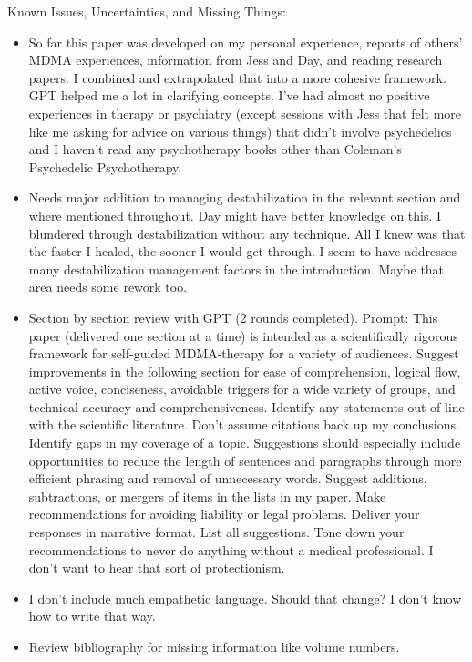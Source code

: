 \documentclass[12pt,letterpaper]{article}
\begin{document}
Known Issues, Uncertainties, and Missing Things:
\begin{itemize}
    \item So far this paper was developed on my personal experience, reports of others' MDMA experiences, information from Jess and Day, and reading research papers. I combined and extrapolated that into a more cohesive framework. GPT helped me a lot in clarifying concepts. I've had almost no positive experiences in therapy or psychiatry (except sessions with Jess that felt more like me asking for advice on various things) that didn't involve psychedelics and I haven't read any psychotherapy books other than Coleman's Psychedelic Psychotherapy.
    \item Needs major addition to managing destabilization in the relevant section and where mentioned throughout. Day might have better knowledge on this. I blundered through destabilization without any technique. All I knew was that the faster I healed, the sooner I would get through. I seem to have addresses many destabilization management factors in the introduction. Maybe that area needs some rework too.
    \item Section by section review with GPT (2 rounds completed). Prompt:
        This paper (delivered one section at a time) is intended as a scientifically rigorous framework for self-guided MDMA-therapy for a variety of audiences.
        Suggest improvements in the following section for ease of comprehension, logical flow, active voice, conciseness, avoidable triggers for a wide variety of groups, and technical accuracy and comprehensiveness.
        Identify any statements out-of-line with the scientific literature. Don't assume citations back up my conclusions. Identify gaps in my coverage of a topic.
        Suggestions should especially include opportunities to reduce the length of sentences and paragraphs through more efficient phrasing and removal of unnecessary words.
        Suggest additions, subtractions, or mergers of items in the lists in my paper.
        Make recommendations for avoiding liability or legal problems.
        Deliver your responses in narrative format. List all suggestions.
        Tone down your recommendations to never do anything without a medical professional. I don't want to hear that sort of protectionism.
    \item I don't include much empathetic language. Should that change? I don't know how to write that way.
    \item Review bibliography for missing information like volume numbers.

\end{itemize}
\end{document}
